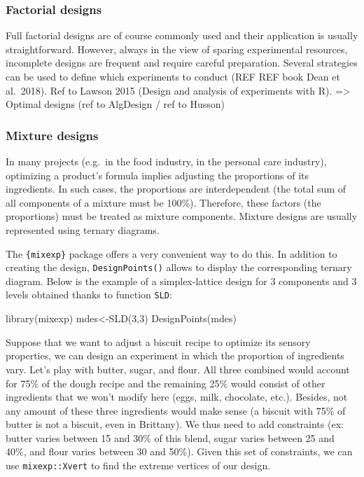 \documentclass[
]{book}
\newenvironment{Shaded}{\begin{snugshade}}{\end{snugshade}}
\newcommand{\DecValTok}[1]{\textcolor[rgb]{0.00,0.00,0.81}{#1}}
\newcommand{\FunctionTok}[1]{\textcolor[rgb]{0.00,0.00,0.00}{#1}}
\newcommand{\NormalTok}[1]{#1}
\newcommand{\OtherTok}[1]{\textcolor[rgb]{0.56,0.35,0.01}{#1}}
\begin{document}
\hypertarget{factorial-designs}{%
\subsubsection{Factorial designs}\label{factorial-designs}}

Full factorial designs are of course commonly used and their application is usually straightforward. However, always in the view of sparing experimental resources, incomplete designs are frequent and require careful preparation. Several strategies can be used to define which experiments to conduct (REF REF book Dean et al.~2018). Ref to Lawson 2015 (Design and analysis of experiments with R).
=\textgreater{} Optimal designs (ref to AlgDesign / ref to Husson)

\hypertarget{mixture-designs}{%
\subsubsection{Mixture designs}\label{mixture-designs}}

In many projects (e.g.~in the food industry, in the personal care industry), optimizing a product's formula implies adjusting the proportions of its ingredients. In such cases, the proportions are interdependent (the total sum of all components of a mixture must be 100\%). Therefore, these factors (the proportions) must be treated as mixture components. Mixture designs are usually represented using ternary diagrams.

The \texttt{\{mixexp\}} package offers a very convenient way to do this. In addition to creating the design, \texttt{DesignPoints()} allows to display the corresponding ternary diagram. Below is the example of a simplex-lattice design for 3 components and 3 levels obtained thanks to function \texttt{SLD}:

\begin{Shaded}
\begin{Highlighting}[]
\FunctionTok{library}\NormalTok{(mixexp)}
\NormalTok{mdes}\OtherTok{\textless{}{-}}\FunctionTok{SLD}\NormalTok{(}\DecValTok{3}\NormalTok{,}\DecValTok{3}\NormalTok{)}
\FunctionTok{DesignPoints}\NormalTok{(mdes)}
\end{Highlighting}
\end{Shaded}

Suppose that we want to adjust a biscuit recipe to optimize its sensory properties, we can design an experiment in which the proportion of ingredients vary. Let's play with butter, sugar, and flour. All three combined would account for 75\% of the dough recipe and the remaining 25\% would consist of other ingredients that we won't modify here (eggs, milk, chocolate, etc.). Besides, not any amount of these three ingredients would make sense (a biscuit with 75\% of butter is not a biscuit, even in Brittany). We thus need to add constraints (ex: butter varies between 15 and 30\% of this blend, sugar varies between 25 and 40\%, and flour varies between 30 and 50\%). Given this set of constraints, we can use \texttt{mixexp::Xvert} to find the extreme vertices of our design.
\end{document}
